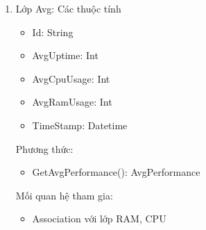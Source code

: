 \begin{enumerate}
\begin{itemize}[label=--]
        \item CreateDisposalRequest(requestDto: DisposalRequestDto)
        \item  UpdateRequestStatus(Id: string, status: string)
    \end{itemize}
    Mối quan hệ tham gia:
    \begin{itemize}[label=--]
        \item Association với lớp Disposal và lớp Asset
    \end{itemize}
    \item Lớp Avg:
    Các thuộc tính
    \begin{itemize}[label=--]
        \item Id: String
        \item AvgUptime: Int
        \item AvgCpuUsage: Int
        \item AvgRamUsage: Int
        \item TimeStamp: Datetime
    \end{itemize}
    Phương thức:
    \begin{itemize}[label=--]
        \item GetAvgPerformance(): AvgPerformance
    \end{itemize}
    Mối quan hệ tham gia:
    \begin{itemize}[label=--]
        \item Association với lớp RAM, CPU
    \end{itemize}
\end{enumerate}
